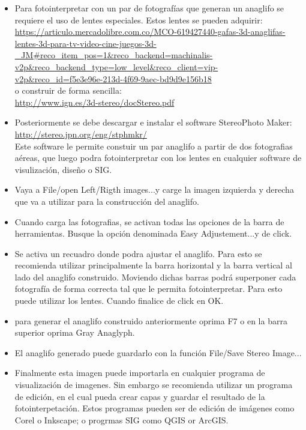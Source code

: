 \documentclass[a4paper,twoside,11pt,]{article}
\begin{document}
\begin{itemize}
\item Para fotointerpretar con un par de fotografías que generan un anaglifo se requiere el uso de lentes especiales. Estos lentes se pueden adquirir:\\ 
\url{https://articulo.mercadolibre.com.co/MCO-619427440-gafas-3d-anaglifas-lentes-3d-para-tv-video-cine-juegos-3d-_JM#reco_item_pos=1&reco_backend=machinalis-v2p&reco_backend_type=low_level&reco_client=vip-v2p&reco_id=f5e3e96e-213d-4f69-9aec-bd9d9e156b18}\\ o construir de forma sencilla:\\
 \url{http://www.ign.es/3d-stereo/docStereo.pdf}
\item Posteriormente se debe descargar e instalar el software StereoPhoto Maker:\\
\url{http://stereo.jpn.org/eng/stphmkr/}\\
Este software le permite constuir un par anaglifo a partir de dos fotografias aéreas, que luego podra fotointerpretar con los lentes en cualquier software de visulización, diseño o SIG.
\item Vaya a File/open Left/Rigth images...y carge la imagen izquierda y derecha que va a utilizar para la construcción del anaglifo. 
\item Cuando carga las fotografias, se activan todas las opciones de la barra de herramientas. Busque la opción denominada Easy Adjustement...y de click.
\item Se activa un recuadro donde podra ajustar el anaglifo. Para esto se recomienda utilizar principalmente la barra horizontal y la barra vertical al lado del anaglifo construido. Moviendo dichas barras podrá superponer cada fotografía de forma correcta tal que le permita fotointerpretar. Para esto puede utilizar los lentes. Cuando finalice de click en OK.
\item para generar el anaglifo construido anteriormente oprima F7 o en la barra superior oprima Gray Anaglyph.
\item El anaglifo generado puede guardarlo con la función File/Save Stereo Image...
\item Finalmente esta imagen puede importarla en cualquier programa de visualización de imagenes. Sin embargo se recomienda utilizar un programa de edición, en el cual pueda crear capas y guardar el resultado de la fotointerpetación. Estos programas pueden ser de edición de imágenes como Corel o Inkscape; o progrmas SIG como QGIS or ArcGIS.
\end {itemize}
\end{document}
